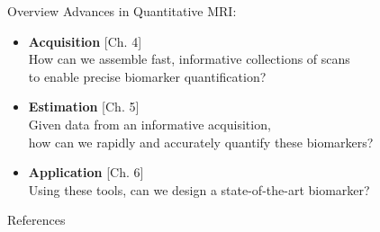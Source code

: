 \documentclass{beamer}
\begin{document}
\begin{frame}{Overview}
	Advances in Quantitative MRI: 
	\begin{itemize}
		\item<0>{
			\textbf{Acquisition} \hfill \textcolor{arch-ivy}{[Ch. 4]} \\
			How can we assemble fast, informative collections of scans \\
			to enable precise biomarker quantification? 
		}
		\item<0>{
			\textbf{Estimation} \hfill \textcolor{arch-ivy}{[Ch. 5]} \\
			Given data from an informative acquisition, \\
			how can we rapidly and accurately quantify these biomarkers?
		}
		\item<1>{
			\textbf{Application} \hfill \textcolor{arch-ivy}{[Ch. 6]} \\
			Using these tools,
			can we design a state-of-the-art biomarker?
		}
	\end{itemize}
\end{frame}



\begin{frame}[allowframebreaks]{References}
	
\end{frame}
\end{document}
